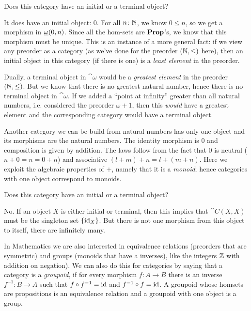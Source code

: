 \begin{Exercise}
  Does this category have an initial or a terminal object? 
\end{Exercise}
\begin{Answer}
  It does have an initial object: 0. For all $n\colon\mathbb{N}$, we know $0\leq n$, so we get a morphism in $\underline{\mathbf{\omega}}(0,n)$. Since all the hom-sets are $\mathbf{Prop}$'s, we know that this morphism must be unique. This is an instance of a more general fact: if we view any preorder as a category (as we've done for the preorder $(\mathbb{N},\leq)$ here), then an initial object in this category (if there is one) is a \emph{least element} in the preorder.

  Dually, a terminal object in $\cat{\omega}$ would be a \emph{greatest element} in the preorder $(\mathbb{N},\leq)$. But we know that there is no greatest natural number, hence there is no terminal object in $\cat{\omega}$. If we added a ``point at infinity'' greater than all natural numbers, i.e. considered the preorder $\omega+1$, then this \emph{would} have a greatest element and the corresponding category would have a terminal object. 
\end{Answer}


Another category we can be build from natural numbers has only one object and its morphisms are the natural numbers. The identity morphism is $0$ and composition is given by addition. The laws follow from the fact that $0$ is neutral ($n+0 = n = 0+n$) and associative $(l+m)+n = l+(m+n)$. Here we exploit the algebraic properties of $+$, namely that it is a \emph{monoid}; hence categories with one object correspond to monoids.

\begin{Exercise}
  Does this category have an initial or a terminal object? 
\end{Exercise}
\begin{Answer}
  No. If an object $X$ is either initial or terminal, then this implies that $\cat{C}(X,X)$ must be the singleton set $\{\mathrm{id}_X\}$. But there is not one morphism from this object to itself, there are infinitely many.
\end{Answer}

In Mathematics we are also interested in equivalence relations (preorders that are symmetric) and groups (monoids that have a inverses), like the integers $\mathbb{Z}$ with addition on negation). We can also do this for categories by saying that a category is a \emph{groupoid}, if for every morphism $f : A \to B$ there is an inverse $f^{-1} : B \to A$ such that $f \circ f^{-1} = \mathrm{id}$ and $f^{-1} \circ f = \mathrm{id}$. A groupoid whose homsets are propositions is an equivalence relation and a groupoid with one object is a group.

